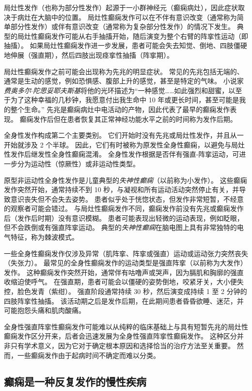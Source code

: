 局灶性发作（也称为部分性发作）起源于一小群神经元（癫痫病灶），因此症状取决于病灶在大脑中的位置。
局灶性癫痫发作可以在不伴有意识改变（通常称为简单部分性发作）或伴有意识改变（通常称为复杂部分性发作）的情况下发生。
典型的局灶性癫痫发作可能从右手抽搐开始，随后演变为整个右臂的阵挛性运动（即抽搐）。
如果局灶性癫痫发作进一步发展，患者可能会失去知觉、倒地、四肢僵硬地伸展（强直期），然后四肢出现痉挛性抽搐（阵挛期）。


局灶性癫痫发作之前可能会出现称为先兆的明显症状。
常见的先兆包括无端的、通常是生动的感觉，例如恐惧感、腹部上升的感觉，甚至是特定的气味。
小说家\textit{费奥多尔$\cdot$陀思妥耶夫斯基}将他的光环描述为“一种感觉……如此强烈和甜蜜，以至于为了这种幸福的几秒钟，我愿意付出我生命中 10 年或更长时间，甚至可能是我的整个生命。” 
先兆是癫痫病灶中电活动的产物，因此代表了最早的癫痫发作表现。
癫痫发作后但在患者恢复其正常神经功能水平之前的时间称为发作后期。


全身性发作构成第二个主要类别。
它们开始时没有先兆或局灶性发作，并且从一开始就涉及 2 个半球。
因此，它们有时被称为原发性全身性癫痫，以避免与局灶性发作后继发性全身性癫痫混淆。
全身性发作根据是否伴有强直-阵挛运动，可进一步分为运动性（惊厥性）或非运动性类型。


原型非运动性全身性发作是儿童典型的\textit{失神性癫痫}（以前称为小发作）。
这些癫痫发作突然开始，通常持续不到 10 秒，与凝视和所有运动活动突然停止有关，并导致意识丧失但不会失去姿势。
患者似乎处于恍惚状态，但发作非常短暂，不经意的观察者可能会错过。
与局灶性癫痫发作不同，癫痫发作前没有先兆或癫痫发作后（发作后时期）没有意识模糊。
患者可能表现出轻微的运动表现，例如眨眼，但不会跌倒或有强直阵挛运动。
典型的\textit{失神性癫痫}在脑电图上具有非常独特的电气特征，称为棘波模式。


一些全身性癫痫发作仅涉及异常（肌阵挛、阵挛或强直）运动或运动张力突然丧失（失张力）。
最常见的全身性癫痫发作的运动类型是强直阵挛（以前称为大发作）发作。
这种癫痫发作突然开始，通常伴有咕噜声或哭声，因为膈肌和胸廓的强直收缩迫使呼气。
在强直期，患者可能会以僵硬的姿势倒地，咬紧牙关，大小便失控，脸色发青（紫绀）。
强直阶段通常持续 30 秒，然后演变成持续 1 至 2 分钟的四肢阵挛性抽搐。
该活动期之后是发作后期，在此期间患者昏昏欲睡、迷茫，并可能抱怨头痛和肌肉酸痛。


全身性强直阵挛性癫痫发作可能难以从纯粹的临床基础上与具有短暂先兆的局灶性癫痫发作区分开来，后者会迅速发展为全身性强直阵挛性癫痫发作。
这种区分并非只有学术意义，因为它对于确定根本原因和选择恰当的治疗方法至关重要。
然而，一些癫痫发作由于起病时间不确定而难以分类。



\subsection{癫痫是一种反复发作的慢性疾病}

